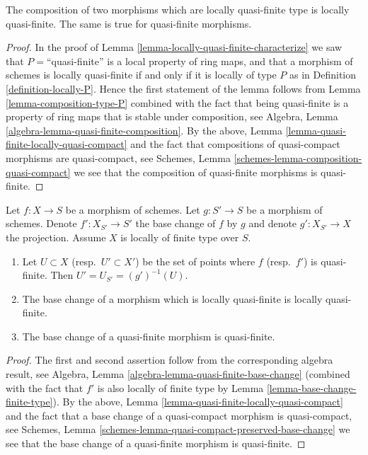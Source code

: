 \begin{lemma}
\label{lemma-composition-quasi-finite}
The composition of two morphisms which are locally quasi-finite type is
locally quasi-finite. The same is true for quasi-finite morphisms.
\end{lemma}

\begin{proof}
In the proof of Lemma \ref{lemma-locally-quasi-finite-characterize}
we saw that $P = $``quasi-finite'' is a local property of ring maps,
and that a morphism of schemes is locally quasi-finite if and only if
it is locally of type $P$ as in Definition \ref{definition-locally-P}.
Hence the first statement of the lemma follows from
Lemma \ref{lemma-composition-type-P} combined
with the fact that being quasi-finite is a property of ring maps that is
stable under composition, see
Algebra, Lemma \ref{algebra-lemma-quasi-finite-composition}.
By the above, Lemma \ref{lemma-quasi-finite-locally-quasi-compact}
and the fact that compositions of
quasi-compact morphisms are quasi-compact, see
Schemes, Lemma \ref{schemes-lemma-composition-quasi-compact}
we see that the composition of quasi-finite morphisms is
quasi-finite.
\end{proof}

\begin{lemma}
\label{lemma-base-change-quasi-finite}
Let $f : X \to S$ be a morphism of schemes.
Let $g : S' \to S$ be a morphism of schemes.
Denote $f' : X_{S'} \to S'$ the base change of $f$ by $g$
and denote $g' : X_{S'} \to X$ the projection.
Assume $X$ is locally of finite type over $S$.
\begin{enumerate}
\item Let $U \subset X$ (resp.\ $U' \subset X'$)
be the set of points where $f$ (resp.\ $f'$) is quasi-finite.
Then $U' = U_{S'} = (g')^{-1}(U)$.
\item The base change of a morphism which is locally quasi-finite
is locally quasi-finite.
\item The base change of a quasi-finite morphism is
quasi-finite.
\end{enumerate}
\end{lemma}

\begin{proof}
The first and second assertion follow from the corresponding
algebra result, see
Algebra, Lemma \ref{algebra-lemma-quasi-finite-base-change}
(combined with the fact that $f'$ is also locally of finite type by
Lemma \ref{lemma-base-change-finite-type}).
By the above, Lemma \ref{lemma-quasi-finite-locally-quasi-compact}
and the fact that a base change of a
quasi-compact morphism is quasi-compact, see
Schemes, Lemma \ref{schemes-lemma-quasi-compact-preserved-base-change}
we see that the base change of a quasi-finite morphism
is quasi-finite.
\end{proof}

